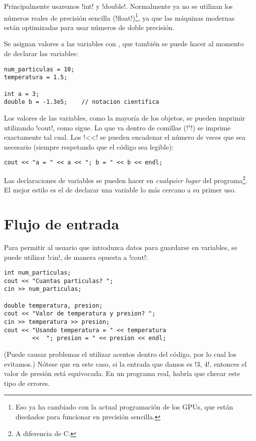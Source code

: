 Principalmente usaremos \inl!int! y \inl!double!.  Normalmente ya no se utilizan
los números reales de precisión sencilla (\inl!float!)\footnote{Eso ya ha
cambiado con la actual programación de los GPUs, que están diseñados para
funcionar en precisión sencilla.}, ya que
las máquinas modernas están optimizadas para usar números de doble precisión.

Se asignan valores a las variables con \inl{=}, que también se puede hacer al
momento de declarar las variables:
\begin{lstlisting}
num_particulas = 10;
temperatura = 1.5;

int a = 3;
double b = -1.3e5;    // notacion cientifica 
\end{lstlisting}

Los valores de las variables, como la mayoría de los objetos, se pueden imprimir
utilizando \inl!cout!, como sigue. Lo que va dentro de comillas (\inl!"!) se
imprime exactamente tal cual. Los \inl!<<! se pueden encadenar el número de
veces que sea necesario (siempre respetando que el código sea legible):
\begin{lstlisting}
cout << "a = " << a << "; b = " << b << endl;
\end{lstlisting}

Las declaraciones de variables se pueden hacer en \emph{cualquier lugar} del
programa\footnote{A diferencia de C.}.  El mejor estilo es el de declarar una
variable lo más cercano a su primer uso.


\section{Flujo de entrada}

Para permitir al usuario que introduzca datos para guardarse en variables,
se puede utilizar \inl!cin!, de manera opuesta a \inl!cout!:
\begin{lstlisting}
int num_particulas;
cout << "Cuantas particulas? ";
cin >> num_particulas;

double temperatura, presion;
cout << "Valor de temperatura y presion? ";
cin >> temperatura >> presion;
cout << "Usando temperatura = " << temperatura 
		<<  "; presion = " << presion << endl;
\end{lstlisting}
(Puede causar problemas el utilizar acentos dentro del código, por lo cual los
evitamos.)
Nótese que en este caso, si la entrada que damos es \inl!3, 4!, entonces el
valor de presión está equivocada. En un programa real, habría que checar este
tipo de errores.



